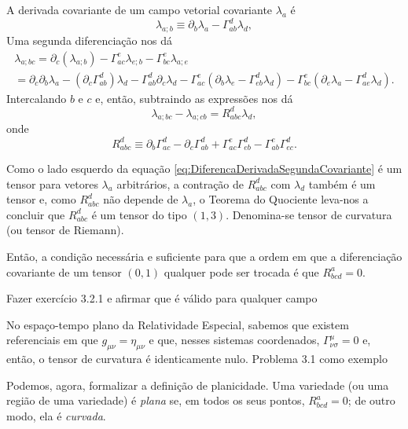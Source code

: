 A derivada covariante de um campo vetorial covariante $\lambda_a$ é
\[
\lambda_{a ; b} \equiv \partial_{b} \lambda_{a}-\Gamma_{a b}^{d} \lambda_{d},
\]
Uma segunda diferenciação nos dá 
\[
\begin{array}{c}{\lambda_{a ; b c}=\partial_{c}\left(\lambda_{a ; b}\right)-\Gamma_{a c}^{e} \lambda_{e ; b}-\Gamma_{b c}^{e} \lambda_{a ; e}} \\ {=\partial_{c} \partial_{b} \lambda_{a}-\left(\partial_{c} \Gamma_{a b}^{d}\right) \lambda_{d}-\Gamma_{a b}^{d} \partial_{c} \lambda_{d}-\Gamma_{a c}^{e}\left(\partial_{b} \lambda_{e}-\Gamma_{e b}^{d} \lambda_{d}\right)-\Gamma_{b c}^{e}\left(\partial_{e} \lambda_{a}-\Gamma_{a e}^{d} \lambda_{d}\right).}\end{array}
\]
Intercalando $b$ e $c$ e, então, subtraindo as expressões nos dá
\begin{equation}\label{eq:DiferencaDerivadaSegundaCovariante}
	\lambda_{a;bc}-\lambda_{a;cb}=R^d_{abc}\lambda_d,
\end{equation}
onde 
\begin{equation}\label{eq:DefinicaoTensorRiemann}
	\boxed{
		R_{a b c}^{d} \equiv \partial_{b} \Gamma_{a c}^{d}-\partial_{c} \Gamma_{a b}^{d}+\Gamma_{a c}^{e} \Gamma_{e b}^{d}-\Gamma_{a b}^{e} \Gamma_{e c}^{d}.
	}
\end{equation}

Como o lado esquerdo da equação \ref{eq:DiferencaDerivadaSegundaCovariante} é um tensor para vetores $\lambda_a$ arbitrários, a contração de $R^d_{abc}$ com $\lambda_d$ também é um tensor e, como $R^d_{abc}$ não depende de $\lambda_a$, o Teorema do Quociente leva-nos a concluir que $R^d_{abc}$ é um tensor do tipo $(1,3)$. Denomina-se tensor de curvatura (ou tensor de Riemann).

Então, a condição necessária e suficiente para que a ordem em que a diferenciação covariante de um tensor $(0,1)$ qualquer pode ser trocada é que $R^a_{bcd}=0$.

{\color{red} Fazer exercício 3.2.1 e afirmar que é válido para qualquer campo}

No espaço-tempo plano da Relatividade Especial, sabemos que existem referenciais em que $g_{\mu\nu}=\eta_{\mu\nu}$ e que, nesses sistemas coordenados, $\Gamma^\mu_{\nu\sigma}=0$ e, então, o tensor de curvatura é identicamente nulo.
 {\color{red} Problema 3.1 como exemplo}

 Podemos, agora, formalizar a definição de {\color{ForestGreen}planicidade}. Uma variedade (ou uma região de uma variedade) é \textit{plana} se, em todos os seus pontos, $R^a_{bcd}=0$; de outro modo, ela é \textit{curvada}. 

